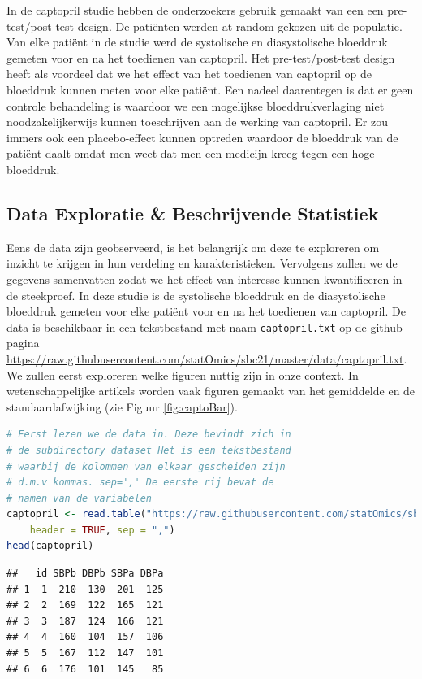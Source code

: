 \documentclass[
  12pt,dutch,coursenotes]{book}
\newcommand{\passthrough}[1]{#1}
\theoremstyle{definition}
\theoremstyle{definition}
\theoremstyle{definition}
\theoremstyle{definition}
\theoremstyle{remark}
\begin{document}
In de captopril studie hebben de onderzoekers gebruik gemaakt van een een pre-test/post-test design.
De patiënten werden at random gekozen uit de populatie.
Van elke patiënt in de studie werd de systolische en diasystolische bloeddruk gemeten voor en na het toedienen van captopril.
Het pre-test/post-test design heeft als voordeel dat we het effect van het toedienen van captopril op de bloeddruk kunnen meten voor elke patiënt. Een nadeel daarentegen is dat er geen controle behandeling is waardoor we een mogelijkse bloeddrukverlaging niet noodzakelijkerwijs kunnen toeschrijven aan de werking van captopril. Er zou immers ook een placebo-effect kunnen optreden waardoor de bloeddruk van de patiënt daalt omdat men weet dat men een medicijn kreeg tegen een hoge bloeddruk.

\hypertarget{data-exploratie-beschrijvende-statistiek}{%
\subsection{Data Exploratie \& Beschrijvende Statistiek}\label{data-exploratie-beschrijvende-statistiek}}

Eens de data zijn geobserveerd, is het belangrijk om deze te exploreren om inzicht te krijgen in hun verdeling en karakteristieken.
Vervolgens zullen we de gegevens samenvatten zodat we het effect van interesse kunnen kwantificeren in de steekproef.
In deze studie is de systolische bloeddruk en de diasystolische bloeddruk gemeten voor elke patiënt voor en na het toedienen van captopril.
De data is beschikbaar in een tekstbestand met naam \passthrough{\lstinline!captopril.txt!} op de github pagina \url{https://raw.githubusercontent.com/statOmics/sbc21/master/data/captopril.txt}.
We zullen eerst exploreren welke figuren nuttig zijn in onze context.
In wetenschappelijke artikels worden vaak figuren gemaakt van het gemiddelde en de standaardafwijking (zie Figuur \ref{fig:captoBar}).

\begin{lstlisting}[language=R]
# Eerst lezen we de data in. Deze bevindt zich in
# de subdirectory dataset Het is een tekstbestand
# waarbij de kolommen van elkaar gescheiden zijn
# d.m.v kommas. sep=',' De eerste rij bevat de
# namen van de variabelen
captopril <- read.table("https://raw.githubusercontent.com/statOmics/sbc21/master/data/captopril.txt",
    header = TRUE, sep = ",")
head(captopril)
\end{lstlisting}

\begin{lstlisting}
##   id SBPb DBPb SBPa DBPa
## 1  1  210  130  201  125
## 2  2  169  122  165  121
## 3  3  187  124  166  121
## 4  4  160  104  157  106
## 5  5  167  112  147  101
## 6  6  176  101  145   85
\end{lstlisting}
\end{document}
